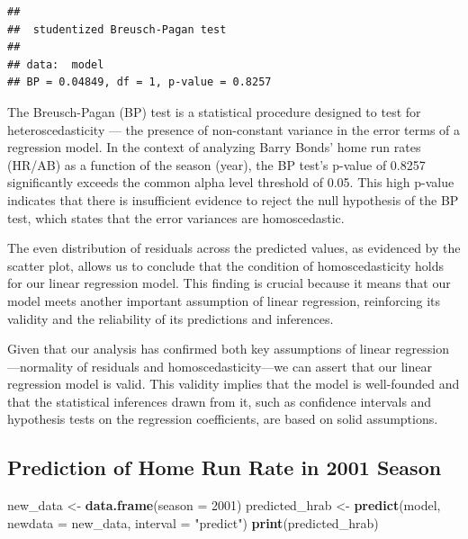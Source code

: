 \documentclass[
]{article}
\newenvironment{Shaded}{\begin{snugshade}}{\end{snugshade}}
\newcommand{\AttributeTok}[1]{\textcolor[rgb]{0.13,0.29,0.53}{#1}}
\newcommand{\DecValTok}[1]{\textcolor[rgb]{0.00,0.00,0.81}{#1}}
\newcommand{\FunctionTok}[1]{\textcolor[rgb]{0.13,0.29,0.53}{\textbf{#1}}}
\newcommand{\NormalTok}[1]{#1}
\newcommand{\OtherTok}[1]{\textcolor[rgb]{0.56,0.35,0.01}{#1}}
\newcommand{\StringTok}[1]{\textcolor[rgb]{0.31,0.60,0.02}{#1}}
\begin{document}
\begin{verbatim}
## 
##  studentized Breusch-Pagan test
## 
## data:  model
## BP = 0.04849, df = 1, p-value = 0.8257
\end{verbatim}

The Breusch-Pagan (BP) test is a statistical procedure designed to test
for heteroscedasticity --- the presence of non-constant variance in the
error terms of a regression model. In the context of analyzing Barry
Bonds' home run rates (HR/AB) as a function of the season (year), the BP
test's p-value of 0.8257 significantly exceeds the common alpha level
threshold of 0.05. This high p-value indicates that there is
insufficient evidence to reject the null hypothesis of the BP test,
which states that the error variances are homoscedastic.

The even distribution of residuals across the predicted values, as
evidenced by the scatter plot, allows us to conclude that the condition
of homoscedasticity holds for our linear regression model. This finding
is crucial because it means that our model meets another important
assumption of linear regression, reinforcing its validity and the
reliability of its predictions and inferences.

Given that our analysis has confirmed both key assumptions of linear
regression---normality of residuals and homoscedasticity---we can assert
that our linear regression model is valid. This validity implies that
the model is well-founded and that the statistical inferences drawn from
it, such as confidence intervals and hypothesis tests on the regression
coefficients, are based on solid assumptions.

\subsection{Prediction of Home Run Rate in 2001
Season}\label{prediction-of-home-run-rate-in-2001-season}

\begin{Shaded}
\begin{Highlighting}[]
\NormalTok{new\_data }\OtherTok{\textless{}{-}} \FunctionTok{data.frame}\NormalTok{(}\AttributeTok{season =} \DecValTok{2001}\NormalTok{)}
\NormalTok{predicted\_hrab }\OtherTok{\textless{}{-}} \FunctionTok{predict}\NormalTok{(model, }\AttributeTok{newdata =}\NormalTok{ new\_data, }\AttributeTok{interval =} \StringTok{"predict"}\NormalTok{)}
\FunctionTok{print}\NormalTok{(predicted\_hrab)}
\end{Highlighting}
\end{Shaded}
\end{document}
